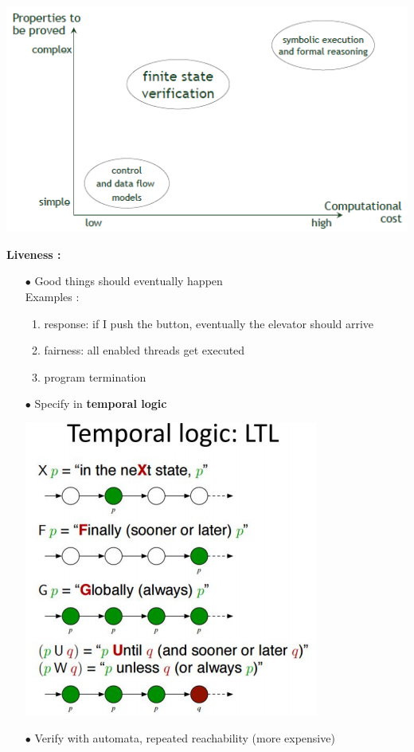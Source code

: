 \documentclass{article}
\begin{document}
\begin{multicols}{2}
\begin{itemize}
\end{itemize}
\begin{center}
    \includegraphics[scale=0.55]{image/25.PNG}
\end{center}
\vfill\null\columnbreak
\noindent\textbf{Liveness :} 
\begin{itemize}
    \item [$\bullet$]Good things should eventually happen\\
    Examples : 
    \begin{enumerate}
        \item response: if I push the button, eventually the
elevator should arrive
        \item fairness: all enabled threads get executed
        \item program termination
    \end{enumerate}
    \item [$\bullet$]Specify in \textbf{temporal logic}
    \begin{center}
    \includegraphics[scale=0.5]{image/26.PNG}
    \end{center}
    \item [$\bullet$]Verify with automata, repeated reachability (more expensive)

\end{itemize}
\end{multicols}
\end{document}

